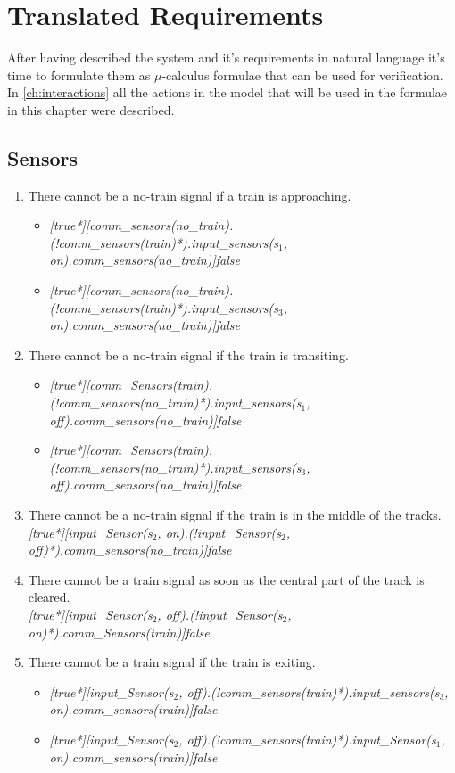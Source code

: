 \documentclass[final]{report}
\begin{document}
\chapter{Translated Requirements}
After having described the system and it's requirements in natural language it's time to formulate them as $\mu$-calculus formulae that can be used for verification. In \cref{ch:interactions} all the actions in the model that will be used in the formulae in this chapter were described.

\section{Sensors}
\begin{enumerate}
\item There cannot be a no-train signal if a train is approaching.
\begin{itemize}
\item \textit{[true*][comm\_sensors(no\_train).(!comm\_sensors(train)*).input\_sensors(s$_{1}$, on).comm\_sensors(no\_train)]false}
\item \textit{[true*][comm\_sensors(no\_train).(!comm\_sensors(train)*).input\_sensors(s$_{3}$, on).comm\_sensors(no\_train)]false} 
\end{itemize}

\item There cannot be a no-train signal if the train is transiting.
\begin{itemize}
\item \textit{[true*][comm\_Sensors(train).(!comm\_sensors(no\_train)*).input\_sensors(s$_{1}$, off).comm\_sensors(no\_train)]false}
\item \textit{[true*][comm\_Sensors(train).(!comm\_sensors(no\_train)*).input\_sensors(s$_{3}$, off).comm\_sensors(no\_train)]false}
\end{itemize}

\item There cannot be a no-train signal if the train is in the middle of the tracks.\\
\textit{[true*][input\_Sensor(s$_{2}$, on).(!input\_Sensor(s$_{2}$, off)*).comm\_sensors(no\_train)]false}

\item There cannot be a train signal as soon as the central part of the track is cleared.\\
\textit{[true*][input\_Sensor(s$_{2}$, off).(!input\_Sensor(s$_{2}$, on)*).comm\_Sensors(train)]false
}

\item There cannot be a train signal if the train is exiting.
\begin{itemize}
\item \textit{[true*][input\_Sensor(s$_{2}$, off).(!comm\_sensors(train)*).input\_sensors(s$_{3}$, on).comm\_sensors(train)]false}
\item \textit{[true*][input\_Sensor(s$_{2}$, off).(!comm\_sensors(train)*).input\_Sensor(s$_{1}$, on).comm\_sensors(train)]false}
\end{itemize}


\end{enumerate}
\end{document}
